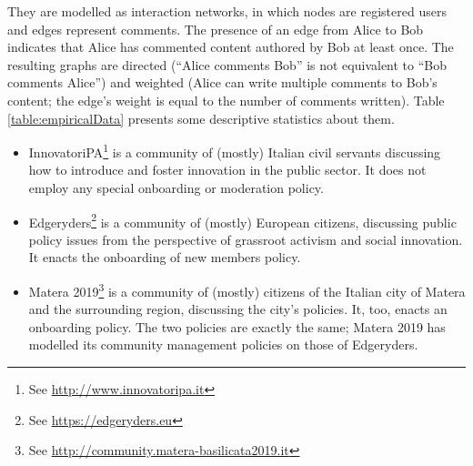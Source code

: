 \documentclass{bmcart}
\begin{document}
They are modelled as interaction networks, in which nodes are registered users and edges represent comments. The presence of an edge from Alice to Bob indicates that Alice has commented content authored by Bob at least once. The resulting graphs are directed (``Alice comments Bob'' is not equivalent to ``Bob comments Alice'') and weighted (Alice can write multiple comments to Bob's content; the edge's weight is equal to the number of comments written). Table \ref{table:empiricalData} presents some descriptive statistics about them. 

\begin{itemize}
\item InnovatoriPA\footnote{See \url{http://www.innovatoripa.it}} is a community of (mostly) Italian civil servants discussing how to introduce and foster innovation in the public sector. It does not employ any special onboarding or moderation policy. 
\item Edgeryders\footnote{See \url{https://edgeryders.eu}} is a community of (mostly) European citizens, discussing public policy issues from the perspective of grassroot activism and social innovation. It enacts the onboarding of new members policy. 
\item Matera 2019\footnote{See \url{http://community.matera-basilicata2019.it}} is a community of (mostly) citizens of the Italian city of Matera and the surrounding region, discussing the city's policies.
It, too, enacts an onboarding policy. The two policies are exactly the same; Matera 2019 has modelled its community management policies on those of Edgeryders.
\end{itemize}
\end{document}
